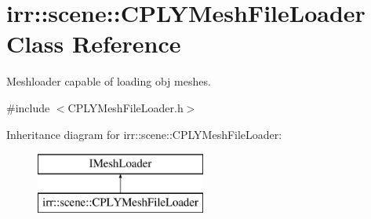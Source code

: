 \hypertarget{classirr_1_1scene_1_1_c_p_l_y_mesh_file_loader}{\section{irr\-:\-:scene\-:\-:C\-P\-L\-Y\-Mesh\-File\-Loader Class Reference}
\label{classirr_1_1scene_1_1_c_p_l_y_mesh_file_loader}
}


Meshloader capable of loading obj meshes.  




{\ttfamily \#include $<$C\-P\-L\-Y\-Mesh\-File\-Loader.\-h$>$}

Inheritance diagram for irr\-:\-:scene\-:\-:C\-P\-L\-Y\-Mesh\-File\-Loader\-:\begin{figure}[H]
\begin{center}
\leavevmode
\includegraphics[height=2.000000cm]{classirr_1_1scene_1_1_c_p_l_y_mesh_file_loader}
\end{center}
\end{figure}
